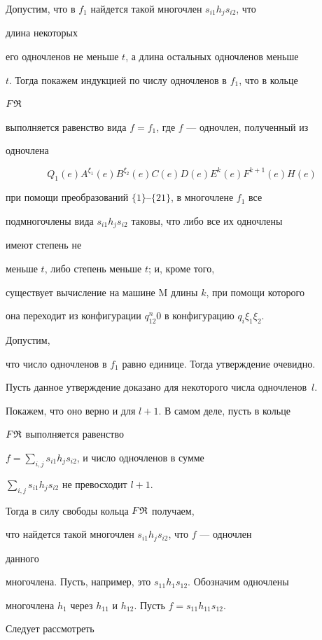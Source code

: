 Допустим, что в $f_1$ найдется такой многочлен $s_{i1}h_j s_{i2}$, что 


длина некоторых  


его одночленов не меньше $t$, а длина остальных одночленов меньше  


$t$. Тогда покажем индукцией по числу одночленов в $f_1$, что в кольце 


$F\frak R$ 


выполняется равенство вида $f=f_1$, где $f$ --- одночлен, полученный из  


одночлена 


$$ 


Q_1(e)A^{\xi_1}(e)B^{\xi_2}(e)C(e)D(e)E^k(e)F^{k+1}(e)H(e) 


$$ 


при помощи преобразований $\{1\}$--$\{21\}$, в многочлене $f_1$ все  


подмногочлены вида $s_{i1}h_j s_{i2}$ таковы, что либо все их одночлены 


имеют степень не  


меньше $t$, либо степень меньше $t$; и, кроме того,  


существует вычисление на машине M длины $k$, при помощи которого  


она переходит из конфигурации $q_12^n0$ в конфигурацию $q_i\xi_1\xi_2$. 


Допустим,  


что число одночленов в $f_1$ равно единице. Тогда утверждение очевидно.  


Пусть данное утверждение доказано для некоторого числа одночленов~$l$.


Покажем, что оно верно и для $l+1$. В самом деле, пусть в кольце  


$F\frak R$ выполняется равенство 


$f=\sum\limits_{i,j}s_{i1}h_j s_{i2}$, и число одночленов в сумме 


$\sum\limits_{i,j}s_{i1}h_j s_{i2}$ не превосходит $l+1$. 


Тогда в силу свободы кольца $F\frak R$ получаем,  


что найдется такой многочлен $s_{i1}h_j s_{i2}$, что $f$ --- одночлен 


данного 


многочлена. Пусть, например, это $s_{11}h_1s_{12}$. Обозначим одночлены  


многочлена $h_1$ через $h_{11}$ и $h_{12}$. Пусть $f=s_{11}h_{11}s_{12}$. 


Следует рассмотреть  


